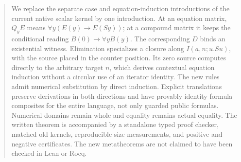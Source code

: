 \documentclass[11pt,a4paper]{article}
\theoremstyle{definition}
\begin{document}
\begin{abstract}
We replace the separate case and equation-induction introductions of the
current native scalar kernel by one introduction. At an equation matrix,
$Q_y E$ means $\forall y(E(y)\to E(Sy))$; at a compound matrix it keeps the
conditional reading $B(0)\to\forall y B(y)$. The corresponding $D$ binds an
existential witness. Elimination specializes a closure along
$I(a,n;u.Su)$, with the source placed in the counter position. Its zero
source computes directly to the arbitrary target $n$, which derives
contextual equation induction without a circular use of an iterator
identity. The new rules admit numerical substitution by direct induction.
Explicit translations preserve derivations in both directions and have
provably identity formula composites for the entire language, not only
guarded public formulas. Numerical domains remain whole and equality
remains actual equality. The written theorem is accompanied by a standalone
typed proof checker, matched old kernels, reproducible size measurements,
and positive and negative certificates. The new metatheorems are not
claimed to have been checked in Lean or Rocq.
\end{abstract}

{\small\tableofcontents}
\newpage




\appendix




\end{document}
